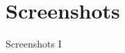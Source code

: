 \documentclass{beamer}
\begin{document}
	\section{Screenshots}
	\begin{frame}{Screenshots I}
		\begin{columns}[onlytextwidth]
			\begin{column}{0.5\textwidth}
				\centering

\end{column}
\end{columns}
\end{frame}
\end{document}
